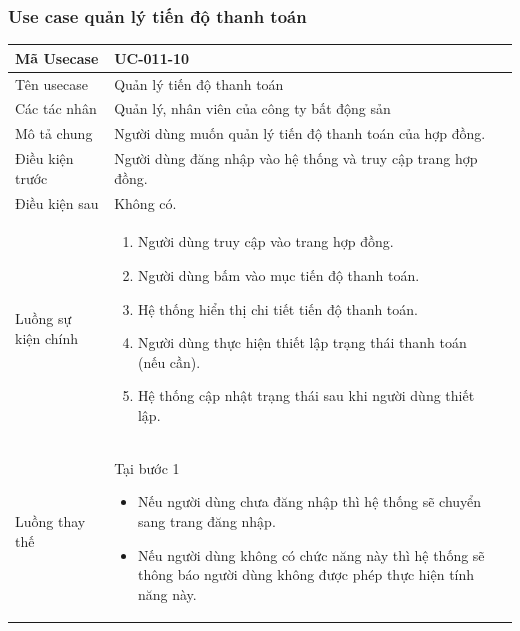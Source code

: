 \documentclass[12pt,a4paper]{article}
\begin{document}
    \subsubsection*{Use case quản lý tiến độ thanh toán}
    \begin{table}[H]
        \centering
        \begin{tabular}{|p{3.5cm}|p{11.5cm}|c|}
            \hline
            Mã Usecase      & UC-011-10                                                     \\
            \hline
            Tên usecase     & Quản lý tiến độ thanh toán                                    \\
            \hline
            Các tác nhân    & Quản lý, nhân viên của công ty bất động sản                   \\
            \hline
            Mô tả chung     & Người dùng muốn quản lý tiến độ thanh toán của hợp đồng.      \\
            \hline

            Điều kiện trước & Người dùng đăng nhập vào hệ thống và truy cập trang hợp đồng. \\
            \hline

            Điều kiện sau   & Không có.                                                     \\
            \hline

            Luồng sự kiện chính & \vspace{-.8cm}\begin{enumerate}
                                                    \item Người dùng truy cập vào trang hợp đồng.
                                                    \item Người dùng bấm vào mục tiến độ thanh toán.
                                                    \item Hệ thống hiển thị chi tiết tiến độ thanh toán.
                                                    \item Người dùng thực hiện thiết lập trạng thái thanh toán (nếu cần).
                                                    \item Hệ thống cập nhật trạng thái sau khi người dùng thiết lập.
            \end{enumerate}
            \\
            \hline
            Luồng thay thế & Tại bước 1\newline
            \vspace{-.8cm}\begin{itemize}
                              \item Nếu người dùng chưa đăng nhập thì hệ thống sẽ chuyển sang trang đăng nhập.
                              \item Nếu người dùng không có chức năng này thì hệ thống sẽ thông báo người dùng không được phép thực hiện tính năng này.
            \end{itemize}


\end{tabular}
\end{table}
\end{document}
